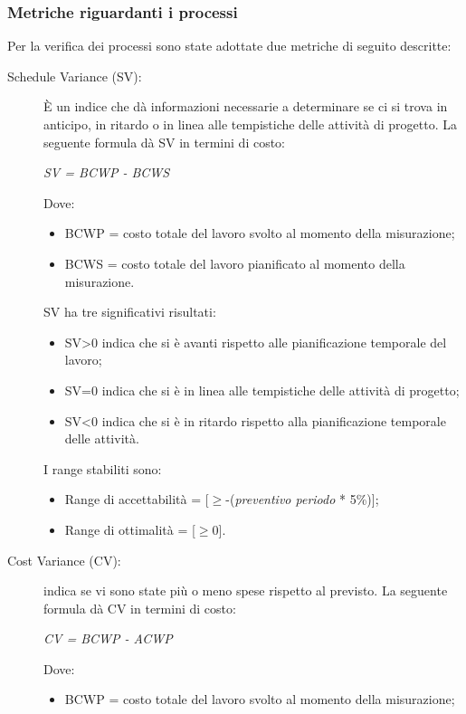     \subsubsection{Metriche riguardanti i processi}
    Per la verifica dei processi sono state adottate due metriche di seguito descritte:
    \begin{description}
      \item[Schedule Variance (SV):] È un indice che dà informazioni necessarie a determinare se ci si trova in anticipo,
      in ritardo o in linea alle tempistiche delle attività di progetto.
      La seguente formula dà SV in termini di costo:
      \begin{center}
        \emph{SV = BCWP - BCWS}
      \end{center}
      Dove:
      \begin{itemize}
        \item BCWP = costo totale del lavoro svolto al momento della misurazione;
        \item BCWS = costo totale del lavoro pianificato al momento della misurazione.
      \end{itemize}
      SV ha tre significativi risultati:
      \begin{itemize}
        \item SV>0 indica che si è avanti rispetto alle pianificazione temporale del lavoro;
        \item SV=0 indica che si è in linea alle tempistiche delle attività di progetto;
        \item SV<0 indica che si è in ritardo rispetto alla pianificazione temporale delle attività.
      \end{itemize}
      I range stabiliti sono:
      \begin{itemize}
        \item Range di accettabilità = [\(\geq\)-(\emph{preventivo periodo} * 5\%)];
        \item Range di ottimalità = [\(\geq\)0].
      \end{itemize}
      \item[Cost Variance (CV):] indica se vi sono state più o meno spese rispetto al previsto.
      La seguente formula dà CV in termini di costo:
      \begin{center}
        \emph{CV = BCWP - ACWP}
      \end{center}
      Dove:
      \begin{itemize}
        \item BCWP = costo totale del lavoro svolto al momento della misurazione;

\end{itemize}
\end{description}
